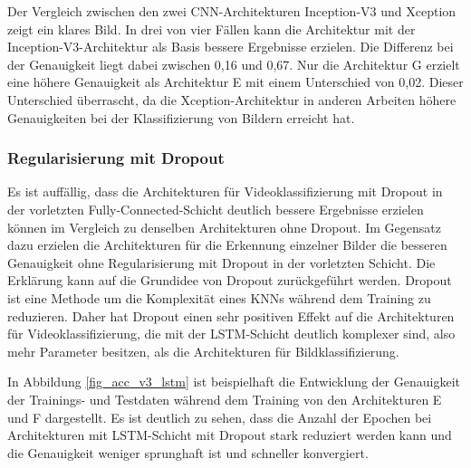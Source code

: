 Der Vergleich zwischen den zwei \ac{CNN}-Architekturen Inception-V3 und Xception zeigt ein klares Bild. In drei von vier Fällen kann die Architektur mit der Inception-V3-Architektur als Basis bessere Ergebnisse erzielen. Die Differenz bei der Genauigkeit liegt dabei zwischen 0,16 und 0,67. Nur die Architektur G erzielt eine höhere Genauigkeit als Architektur E mit einem Unterschied von 0,02. Dieser Unterschied überrascht, da die Xception-Architektur in anderen Arbeiten \cite{chollet2017xception} höhere Genauigkeiten bei der Klassifizierung von Bildern erreicht hat.

\subsubsection{Regularisierung mit Dropout}

Es ist auffällig, dass die Architekturen für Videoklassifizierung mit Dropout in der vorletzten Fully-Connected-Schicht deutlich bessere Ergebnisse erzielen können im Vergleich zu denselben Architekturen ohne Dropout. Im Gegensatz dazu erzielen die Architekturen für die Erkennung einzelner Bilder die besseren Genauigkeit ohne Regularisierung mit Dropout in der vorletzten Schicht. Die Erklärung kann auf die Grundidee von Dropout zurückgeführt werden. Dropout ist eine Methode um die Komplexität eines \acp{KNN} während dem Training zu reduzieren. Daher hat Dropout einen sehr positiven Effekt auf die Architekturen für Videoklassifizierung, die mit der \ac{LSTM}-Schicht deutlich komplexer sind, also mehr Parameter besitzen, als die Architekturen für Bildklassifizierung.

In Abbildung \ref{fig_acc_v3_lstm} ist beispielhaft die Entwicklung der Genauigkeit der Trainings- und Testdaten während dem Training von den Architekturen E und F dargestellt. Es ist deutlich zu sehen, dass die Anzahl der Epochen bei Architekturen mit \ac{LSTM}-Schicht mit Dropout stark reduziert werden kann und die Genauigkeit weniger sprunghaft ist und schneller konvergiert.

